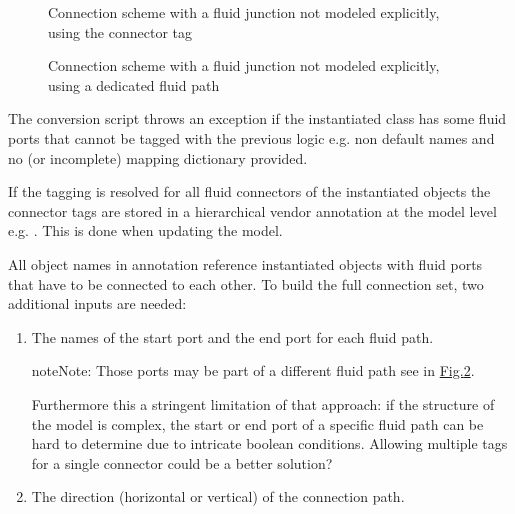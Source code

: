 \documentclass[letterpaper,10pt, openany,english]{sphinxmanual}
\begin{document}
\begin{figure}[htbp]
\centering
\capstart

\noindent{}
\caption{Connection scheme with a fluid junction not modeled explicitly, using the connector tag }\label{\detokenize{requirements:linkage-connect-3wv}}\end{figure}

\begin{figure}[htbp]
\centering
\capstart

\noindent{}
\caption{Connection scheme with a fluid junction not modeled explicitly, using a dedicated fluid path}\label{\detokenize{requirements:linkage-connect-multi}}\end{figure}

The conversion script throws an exception if the instantiated class has some fluid ports that cannot be tagged with the previous logic e.g. non default names and no (or incomplete) mapping dictionary provided.

If the tagging is resolved for all fluid connectors of the instantiated objects the connector tags are stored in a hierarchical vendor annotation at the model level e.g. . This is done when updating the model.

All object names in  annotation reference instantiated objects with fluid ports that have to be connected to each other. To build the full connection set, two additional inputs are needed:
\begin{enumerate}
%
\item {} 
The names of the start port and the end port for each fluid path.

\begin{sphinxadmonition}{note}{Note:}
Those ports may be part of a different fluid path see  in \hyperref[\detokenize{requirements:linkage-connect-multi}]{Fig.\@ \ref{\detokenize{requirements:linkage-connect-multi}}}.

Furthermore this a stringent limitation of that approach: if the structure of the model is complex, the start or end port of a specific fluid path can be hard to determine due to intricate boolean conditions. Allowing multiple tags for a single connector could be a better solution?
\end{sphinxadmonition}

\item {} 
The direction (horizontal or vertical) of the connection path.

\end{enumerate}
\end{document}
